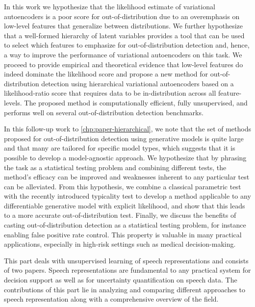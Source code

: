 In this work we hypothesize that the likelihood estimate of variational autoencoders is a poor score for out-of-distribution due to an overemphasis on low-level features that generalize between distributions. 
We further hypothesize that a well-formed hierarchy of latent variables provides a tool that can be used to select which features to emphasize for out-of-distribution detection and, hence, a way to improve the performance of variational autoencoders on this task. 
We proceed to provide empirical and theoretical evidence that low-level features do indeed dominate the likelihood score and propose a new method for out-of-distribution detection using hierarchical variational autoencoders based on a likelihood-ratio score that requires data to be in-distribution across all feature-levels. 
The proposed method is computationally efficient, fully unsupervised, and performs well on several out-of-distribution detection benchmarks. 

In this follow-up work to \cref{chp:paper-hierarchical}, we note that the set of methods proposed for out-of-distribution detection using generative models is quite large and that many are tailored for specific model types, which suggests that it is possible to develop a model-agnostic approach. We hypothesize that by phrasing the task as a statistical testing problem and combining different tests, the method's efficacy can be improved and weaknesses inherent to any particular test can be alleviated. 
From this hypothesis, we combine a classical parametric test with the recently introduced typicality test to develop a method applicable to any differentiable  generative model with explicit likelihood, and show that this leads to a more accurate out-of-distribution test. 
Finally, we discuss the benefits of casting out-of-distribution detection as a statistical testing problem, for instance enabling false positive rate control. This property is valuable in many practical applications, especially in high-risk settings such as medical decision-making.


This part deals with unsupervised learning of speech representations and consists of two papers. Speech representations are fundamental to any practical system for decision support as well as for uncertainty quantification on speech data. 
The contributions of this part lie in analyzing and comparing different approaches to speech representation along with a comprehensive overview of the field.

